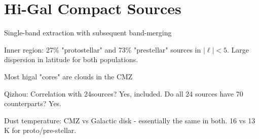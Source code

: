 \section{Hi-Gal Compact Sources}

Single-band extraction with subsequent band-merging

Inner region: 27\% "protostellar" and 73\% "prestellar" sources in $|\ell|<5$.
Large dispersion in latitude for both populations.

Most higal "cores" are clouds in the CMZ

Qizhou: Correlation with 24\um sources?  Yes, included.  Do all 24 \um sources have 70 \um counterparts?  Yes.

Dust temperature: CMZ vs Galactic disk -  essentially the same in both.  16 vs 13 K for proto/pre-stellar.